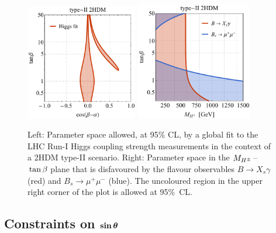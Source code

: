 \documentclass[a4paper, 11pt,notoc]{article}
\def\bm#1{\mbox{\boldmath$#1$\unboldmath}}
\begin{document}
\begin{figure}[t!]
\centering
\includegraphics[width=0.435\textwidth]{figure3l.pdf} \qquad 
\includegraphics[width=0.45\textwidth]{figure3r.pdf}
\vspace{4mm}
\caption{\label{fig:higgsflavourfit} Left: Parameter space allowed, at 95\% CL, by a global fit to the LHC Run-I Higgs coupling strength measurements in the context of a 2HDM type-II scenario. Right: Parameter space in the $M_{H^\pm}\hspace{0.5mm}$--$\hspace{0.5mm}\tan \beta$ plane that is disfavoured by the flavour observables $B \to X_s \gamma$ (red) and $B_s \to \mu^+ \mu^-$ (blue). The uncoloured region in the upper right corner of the plot is allowed at 95\%~CL. }
\end{figure}

\subsection{Constraints on $\bm{\sin \theta}$}
\end{document}
